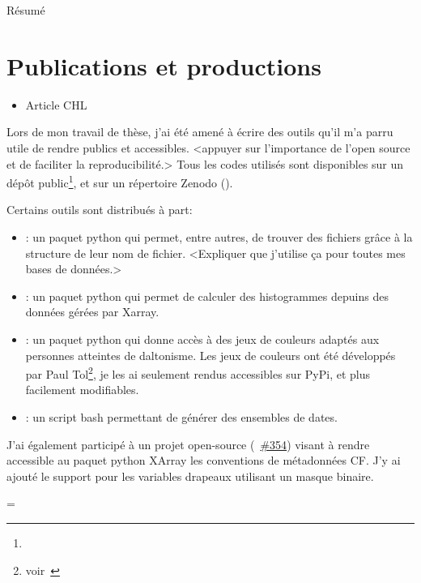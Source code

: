 
Résumé


\clearpage
\section{Publications et productions}
\label{sec:productions}

\begin{itemize}
        \item Article CHL
\end{itemize}
\medskip

Lors de mon travail de thèse, j'ai été amené à écrire des outils qu'il m'a parru utile de rendre publics et accessibles.
<appuyer sur l'importance de l'open source et de faciliter la reproducibilité.>
Tous les codes utilisés sont disponibles sur un dépôt public\footnote{%
}, et sur un répertoire Zenodo ().
\medskip

Certains outils sont distribués à part:
\begin{itemize}
  \item {}:
        un paquet python qui permet, entre autres, de trouver des fichiers grâce à la structure de leur nom de fichier.
        <Expliquer que j'utilise ça pour toutes mes bases de données.>
  \item {}:
        un paquet python qui permet de calculer des histogrammes depuins des données gérées par Xarray.
  \item {}:
        un paquet python qui donne accès à des jeux de couleurs adaptés aux personnes atteintes de daltonisme. Les jeux de couleurs ont été développés par Paul Tol\footnote{voir~}, je les ai seulement rendus accessibles sur PyPi, et plus facilement modifiables.
  \item {}:
        un script bash permettant de générer des ensembles de dates.
\end{itemize}
\medskip

J'ai également participé à un projet open-source (~\href{https://github.com/xarray-contrib/cf-xarray/pull/354}{\#354}) visant à rendre accessible au paquet python XArray les conventions de métadonnées CF.\@
J'y ai ajouté le support pour les variables drapeaux utilisant un masque binaire.

{%
  \raggedright%
  \emergencystretch=\textwidth
  \printbibliography[heading=none, type=software, keyword=personnal]
}
